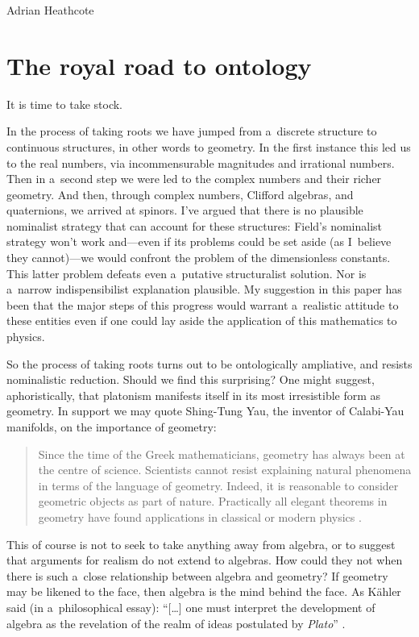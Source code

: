 \begin{artengenv}{Adrian Heathcote}
\section{The royal road to ontology}

It is time to take stock. 

In the process of taking roots we have jumped from a~discrete structure to continuous structures, in other words to geometry. In the first instance this led us to the real numbers, via incommensurable magnitudes and irrational numbers. Then in a~second step we were led to the complex numbers and their richer geometry. And then, through complex numbers, Clifford algebras, and quaternions, we arrived at spinors. I've argued that there is no plausible nominalist strategy that can account for these structures: Field's nominalist strategy won't work and---even if its problems could be set aside (as I~believe they cannot)---we would confront the problem of the dimensionless constants. This latter problem defeats even a~putative structuralist solution. Nor is a~narrow indispensibilist explanation plausible. My suggestion in this paper has been that the major steps of this progress would warrant a~realistic attitude to these entities even if one could lay aside the application of this mathematics to physics.

So the process of taking roots turns out to be ontologically ampliative, and resists nominalistic reduction. Should we find this surprising? One might suggest, aphoristically, that platonism manifests itself in its most irresistible form as geometry. In support we may quote Shing-Tung Yau, the inventor of Calabi-Yau manifolds, on the importance of geometry: 
\begin{quotation}
Since the time of the Greek mathematicians, geometry has always been at the centre of science. Scientists cannot resist explaining natural phenomena in terms of the language of geometry. Indeed, it is reasonable to consider geometric objects as part of nature. Practically all elegant theorems in geometry have found applications in classical or modern physics \parencite[253]{arnold_review_2000}.
\end{quotation}
This of course is not to seek to take anything away from algebra, or to suggest that arguments for realism do not extend to algebras. How could they not when there is such a~close relationship between algebra and geometry? If geometry may be likened to the face, then algebra is the mind behind the face. As Kähler said (in a~philosophical essay): ``[\ldots] one must interpret the development of algebra as the revelation of the realm of ideas postulated by \textit{Plato}'' \parencite{kahler_il_2003}.


\end{artengenv}
